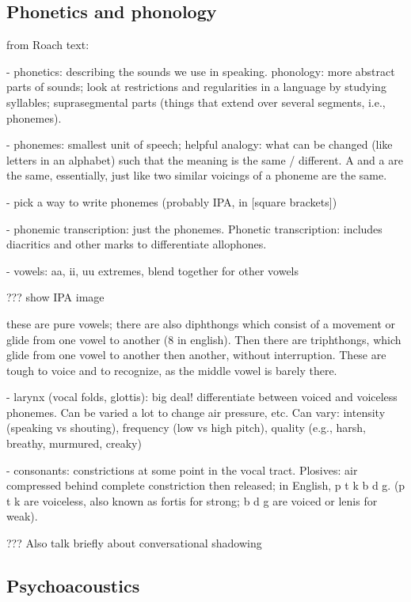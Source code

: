 \subsection{Phonetics and phonology}

from Roach text:

- phonetics: describing the sounds we use in speaking.
  phonology: more abstract parts of sounds; look at restrictions
  and regularities in a language by studying syllables;
  suprasegmental parts (things that extend over several segments,
  i.e., phonemes).

- phonemes: smallest unit of speech; helpful analogy:
  what can be changed (like letters in an alphabet) such that
  the meaning is the same / different. A and a are the same,
  essentially, just like two similar voicings of a phoneme
  are the same.

  - pick a way to write phonemes (probably IPA, in [square brackets])

  - phonemic transcription: just the phonemes. Phonetic transcription:
    includes diacritics and other marks to differentiate allophones.

- vowels: aa, ii, uu extremes, blend together for other vowels

  ??? show IPA image

  these are pure vowels; there are also diphthongs which consist
  of a movement or glide from one vowel to another (8 in english).
  Then there are triphthongs, which glide from one vowel
  to another then another, without interruption.
  These are tough to voice and to recognize, as the middle
  vowel is barely there.

- larynx (vocal folds, glottis): big deal! differentiate between
  voiced and voiceless phonemes. Can be varied a lot
  to change air pressure, etc. Can vary:
  intensity (speaking vs shouting),
  frequency (low vs high pitch),
  quality (e.g., harsh, breathy, murmured, creaky)

- consonants: constrictions at some point in the vocal tract.
  Plosives: air compressed behind complete constriction then released;
  in English, p t k b d g. (p t k are voiceless, also known as fortis
  for strong; b d g are voiced or lenis for weak).

??? Also talk briefly about conversational shadowing

\subsection{Psychoacoustics}

